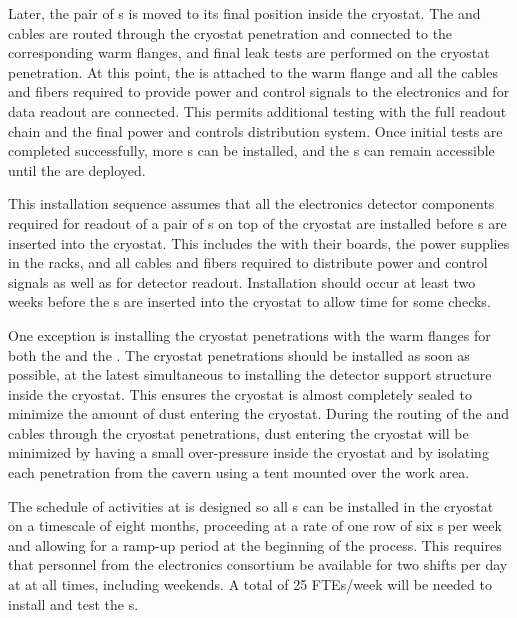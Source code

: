 Later, the pair of s is moved to its final position 
inside the cryostat. The 
and  cables are routed through the cryostat penetration and
connected to the corresponding warm flanges, and final leak tests are performed
on the cryostat penetration. At this point, the  is attached
to the warm flange and all the cables and fibers required to provide 
power and control signals to the  electronics and for data
readout are connected. This permits additional testing with the full 
 readout chain and the final power and controls distribution
system. Once initial tests are completed successfully, more s
can be installed, and the s can remain accessible until the  are
deployed.

This installation sequence assumes that all the  electronics detector 
components required for readout of a pair of s  on top of the cryostat 
are installed before s are inserted into the cryostat. This 
includes the  with their boards, the power supplies in 
the racks, and all cables and fibers required to distribute power and
control signals as well as for detector readout. Installation should occur at least two weeks before
the s are inserted into the cryostat to allow time for some checks. 

One exception
is installing the cryostat penetrations with the warm flanges
for both the  and the . The cryostat
penetrations should be installed as soon as possible, at the latest
simultaneous to installing the detector support structure
inside the cryostat. This ensures the cryostat is almost 
completely sealed to minimize the amount of dust 
entering the cryostat. During the routing of the  and
 cables through the cryostat penetrations, dust entering the cryostat will be minimized by having a small
over-pressure inside the cryostat and by isolating each penetration
from the cavern using a tent mounted over 
the work area.

The schedule of activities at  is designed so all 
s can be installed in the cryostat on a timescale of eight
months, proceeding at a rate of one row of six s per week and
allowing for a ramp-up period at the beginning of the process. This
requires that personnel from the  electronics consortium be available
for two shifts per day at  at all times, including weekends. A
total of 25 FTEs/week will be needed to install and test the s. 

